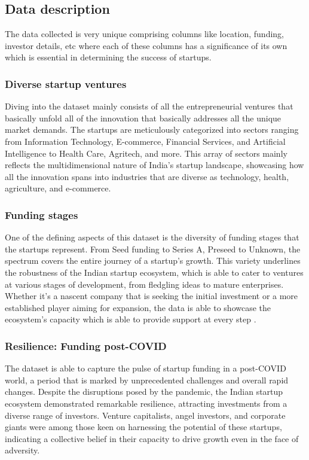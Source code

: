 \documentclass[12pt]{article}
\begin{document}
\subsection{Data description}

The data collected is very unique comprising columns like location, funding, investor details, etc where each of these columns has a significance of its own which is essential in determining the success of startups.  

\subsubsection{Diverse startup ventures}

Diving into the dataset mainly consists of all the entrepreneurial ventures that basically unfold all of the innovation that basically addresses all the unique market demands. The startups are meticulously categorized into sectors ranging from Information Technology, E-commerce, Financial Services, and Artificial Intelligence to Health Care, Agritech, and more. This array of sectors mainly reflects the multidimensional nature of India's startup landscape, showcasing how all the innovation spans into industries that are diverse as technology, health, agriculture, and e-commerce.

\subsubsection{Funding stages}

One of the defining aspects of this dataset is the diversity of funding stages that the startups represent. From Seed funding to Series A, Preseed to Unknown, the spectrum covers the entire journey of a startup's growth. This variety underlines the robustness of the Indian startup ecosystem, which is able to cater to ventures at various stages of development, from fledgling ideas to mature enterprises. Whether it's a nascent company that is seeking the initial investment or a more established player aiming for expansion, the data is able to showcase the ecosystem's capacity which is able to provide support at every step \citep{garg2021startups}.

\subsubsection{Resilience: Funding post-COVID}

The dataset is able to capture the pulse of startup funding in a post-COVID world, a period that is marked by unprecedented challenges and overall rapid changes. Despite the disruptions posed by the pandemic, the Indian startup ecosystem demonstrated remarkable resilience, attracting investments from a diverse range of investors. Venture capitalists, angel investors, and corporate giants were among those keen on harnessing the potential of these startups, indicating a collective belief in their capacity to drive growth even in the face of adversity.
\end{document}

